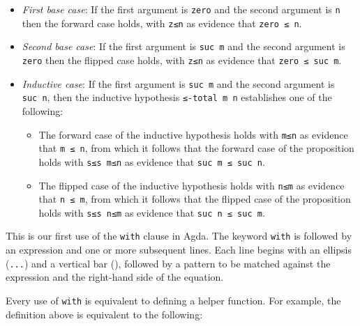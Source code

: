 \begin{itemize}
\item
  \emph{First base case}: If the first argument is \texttt{zero} and the
  second argument is \texttt{n} then the forward case holds, with
  \texttt{z≤n} as evidence that \texttt{zero\ ≤\ n}.
\item
  \emph{Second base case}: If the first argument is \texttt{suc\ m} and
  the second argument is \texttt{zero} then the flipped case holds, with
  \texttt{z≤n} as evidence that \texttt{zero\ ≤\ suc\ m}.
\item
  \emph{Inductive case}: If the first argument is \texttt{suc\ m} and
  the second argument is \texttt{suc\ n}, then the inductive hypothesis
  \texttt{≤-total\ m\ n} establishes one of the following:

  \begin{itemize}
  \item
    The forward case of the inductive hypothesis holds with \texttt{m≤n}
    as evidence that \texttt{m\ ≤\ n}, from which it follows that the
    forward case of the proposition holds with \texttt{s≤s\ m≤n} as
    evidence that \texttt{suc\ m\ ≤\ suc\ n}.
  \item
    The flipped case of the inductive hypothesis holds with \texttt{n≤m}
    as evidence that \texttt{n\ ≤\ m}, from which it follows that the
    flipped case of the proposition holds with \texttt{s≤s\ n≤m} as
    evidence that \texttt{suc\ n\ ≤\ suc\ m}.
  \end{itemize}
\end{itemize}

This is our first use of the \texttt{with} clause in Agda. The keyword
\texttt{with} is followed by an expression and one or more subsequent
lines. Each line begins with an ellipsis (\texttt{...}) and a vertical
bar (\texttt{\textbar{}}), followed by a pattern to be matched against
the expression and the right-hand side of the equation.

Every use of \texttt{with} is equivalent to defining a helper function.
For example, the definition above is equivalent to the following:

